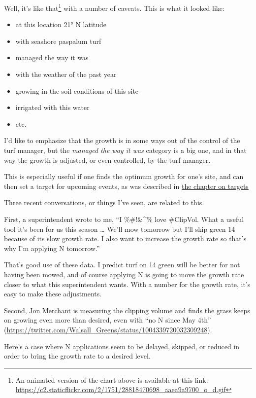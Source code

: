 \documentclass[12pt,b5,]{tufte-book}
\providecommand{\tightlist}{%
  \setlength{\itemsep}{0pt}\setlength{\parskip}{0pt}}
\begin{document}
Well, it's like that\footnote{An animated version of the chart above is available at this link: \url{https://c2.staticflickr.com/2/1751/28818470698_aaea9a9700_o_d.gif}} with a number of caveats. This is what it looked like:

\begin{itemize}
\tightlist
\item
  at this location 21° N latitude
\item
  with seashore paspalum turf
\item
  managed the way it was
\item
  with the weather of the past year
\item
  growing in the soil conditions of this site
\item
  irrigated with this water
\item
  etc.
\end{itemize}

I'd like to emphasize that the growth is in some ways out of the control of the turf manager, but the \emph{managed the way it was} category is a big one, and in that way the growth is adjusted, or even controlled, by the turf manager.

This is especially useful if one finds the optimum growth for one's site, and can then set a target for upcoming events, as was described in \protect\hyperlink{animation1}{the chapter on targets}

Three recent conversations, or things I've seen, are related to this.

First, a superintendent wrote to me, ``I \%\#!\&\^{}\% love \#ClipVol. What a useful tool it's been for us this season \ldots{} We'll mow tomorrow but I'll skip green 14 because of its slow growth rate. I also want to increase the growth rate so that's why I'm applying N tomorrow.''

That's good use of these data. I predict turf on 14 green will be better for not having been mowed, and of course applying N is going to move the growth rate closer to what this superintendent wants. With a number for the growth rate, it's easy to make these adjustments.

Second, Jon Merchant is measuring the clipping volume and finds the grass keeps on growing even more than desired, even with ``no N since May 4th'' (\url{https://twitter.com/Walsall_Greens/status/1004339720032309248}).

Here's a case where N applications seem to be delayed, skipped, or reduced in order to bring the growth rate to a desired level.
\end{document}
